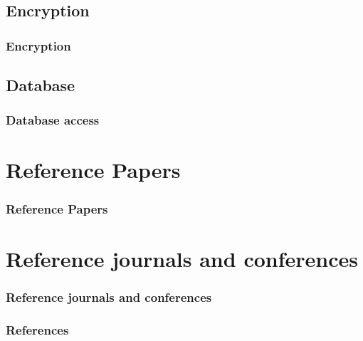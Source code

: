 \documentclass{beamer}
\begin{document}
\subsection{Encryption}

\begin{frame}
\frametitle{Encryption}
\end{frame}

\subsection{Database}

\begin{frame}
\frametitle{Database access}
\end{frame}

\section{Reference Papers}


\begin{frame}
\frametitle{Reference Papers}
\end{frame}

\section{Reference journals and conferences}

\begin{frame}
\frametitle{Reference journals and conferences}
\end{frame}

\begin{frame}[allowframebreaks]
        \frametitle{References}
        
        
\end{frame}
\end{document}
